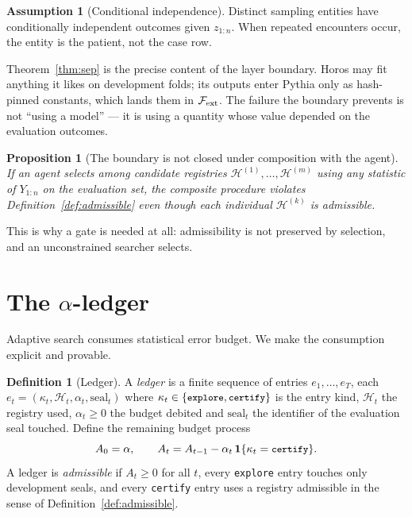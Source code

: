 \documentclass[11pt,a4paper]{article}
\newtheorem{proposition}[theorem]{Proposition}
\theoremstyle{definition}
\newtheorem{definition}[theorem]{Definition}
\newtheorem{assumption}[theorem]{Assumption}
\theoremstyle{remark}
\newcommand{\Fcal}{\mathcal{F}}
\newcommand{\Hcal}{\mathcal{H}}
\newcommand{\code}[1]{\texttt{\small#1}}
\newcommand{\ind}{\mathbf{1}}
\begin{document}
\begin{assumption}[Conditional independence]\label{as:indep2}
Distinct sampling entities have conditionally independent outcomes given $z_{1:n}$. When repeated encounters occur, the entity is the patient, not the case row.
\end{assumption}

Theorem~\ref{thm:sep} is the precise content of the layer boundary. Horos may fit anything it likes on development folds; its outputs enter Pythia only as hash-pinned constants, which lands them in $\Fcal_{\rm ext}$. The failure the boundary prevents is not ``using a model'' --- it is using a quantity whose value depended on the evaluation outcomes.

\begin{proposition}[The boundary is not closed under composition with the agent]\label{prop:agentbound}
If an agent selects among candidate registries $\Hcal^{(1)},\dots,\Hcal^{(m)}$ using any statistic of $Y_{1:n}$ on the evaluation set, the composite procedure violates Definition~\ref{def:admissible} even though each individual $\Hcal^{(k)}$ is admissible.
\end{proposition}

This is why a gate is needed at all: admissibility is not preserved by selection, and an unconstrained searcher selects.

\section{The $\alpha$-ledger}\label{sec:ledger}

Adaptive search consumes statistical error budget. We make the consumption explicit and provable.

\begin{definition}[Ledger]\label{def:ledger}
A \emph{ledger} is a finite sequence of entries $e_1,\dots,e_T$, each $e_t=(\kappa_t,\Hcal_t,\alpha_t,\mathrm{seal}_t)$ where $\kappa_t\in\{\code{explore},\code{certify}\}$ is the entry kind, $\Hcal_t$ the registry used, $\alpha_t\ge0$ the budget debited and $\mathrm{seal}_t$ the identifier of the evaluation seal touched. Define the remaining budget process
\[
A_0=\alpha,\qquad A_t = A_{t-1}-\alpha_t\,\ind\{\kappa_t=\code{certify}\}.
\]
A ledger is \emph{admissible} if $A_t\ge0$ for all $t$, every \code{explore} entry touches only development seals, and every \code{certify} entry uses a registry admissible in the sense of Definition~\ref{def:admissible}.
\end{definition}
\end{document}
